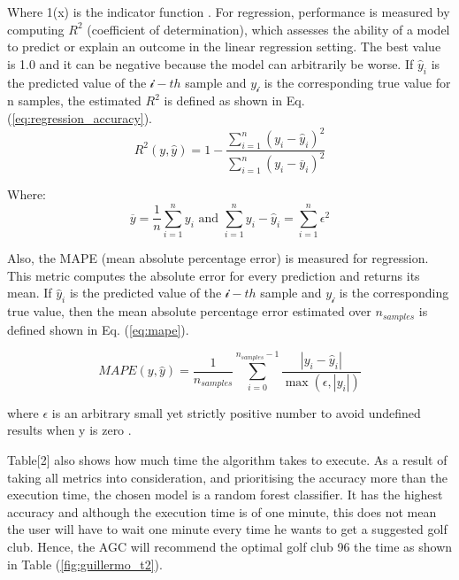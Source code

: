 \documentclass[11pt,landscape]{article}
\begin{document}
\begin{multicols}{3}
Where 1(x) is the indicator function \cite{scikit}. For
regression, performance is measured by computing $R^2$ (coefficient of
determination), which assesses the ability of a model to predict or explain an
outcome in the linear regression setting. The best value is 1.0 and it can be
negative because the model can arbitrarily be worse. If ${\hat{y}}_i$ is the
predicted value of the $\mathcal{i}-th$ sample and $y_\mathcal{i}$ is the
corresponding true value for n samples, the estimated $R^2$ is defined as shown in
Eq. (\ref{eq:regression_accuracy}).
\begin{equation}
        R^2(y,\hat{y})=1 - \frac{\sum_{i=1}^{n}(y_i-\hat{y}_i)^2}{\sum_{i=1}^{n}(y_i-\overline{y}_i)^2}
    \label{eq:regression_accuracy}
\end{equation}

Where:
\begin{equation*}
        \overline{y} = \frac{1}{n}\sum_{i=1}^{n}y_i \textrm{ and } \sum_{i=1}^{n}{y_i - \hat{y}_i} = \sum_{i=1}^{n}\epsilon^2
\end{equation*}

Also, the MAPE (mean absolute percentage error) is measured for regression. This
metric computes the absolute error for every prediction and returns its mean. If
${\hat{y}}_i$ is the predicted value of the $\mathcal{i}-th$ sample and
$y_\mathcal{i}$ is the corresponding true value, then the mean absolute percentage
error estimated over $n_{samples}$ is defined shown in Eq. (\ref{eq:mape}).

\begin{equation}
        MAPE(y,\hat{y})=\frac{1}{n_{samples}}\sum_{i=0}^{n_{samples} - 1}\frac{\left|y_i - \hat{y}_i\right|}{\max(\epsilon,|y_i|)}
        \label{eq:mape}
\end{equation}

where $\epsilon$ is an arbitrary small yet strictly positive number to avoid
undefined results when y is zero
\cite{scikit}.

Table[2] also shows how much time the algorithm takes to execute. As a result of
taking all metrics into consideration, and prioritising the accuracy more than
the execution time, the chosen model is a random forest classifier. It has the
highest accuracy and although the execution time is of one minute, this does not
mean the user will have to wait one minute every time he wants to get a
suggested golf club. Hence, the AGC will recommend the optimal golf club 96%
the time as shown in Table (\ref{fig:guillermo_t2}).


\end{multicols}
\end{document}
